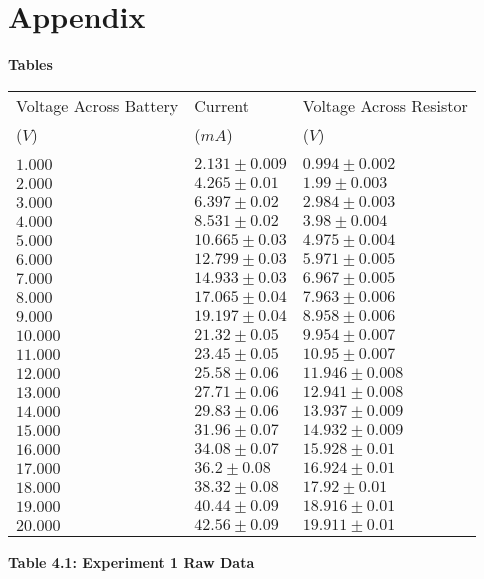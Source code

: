 \documentclass[
	letterpaper, %
	10pt, %
]{CSUniSchoolLabReport}
\begin{document}
\section{Appendix}
{\large \textbf{Tables}}\\
\begin{center}
	\begin{tabular}{ | l | l | l | }
		\hline
		Voltage Across Battery&Current& Voltage Across Resistor\\
		($V$) & ($mA$) & ($V$)\\
		 & & \\
		\hline
		$1.000$&$2.131\pm0.009$&$0.994\pm0.002$\\
		$2.000$&$4.265\pm0.01$&$1.99\pm0.003$\\
		$3.000$&$6.397\pm0.02$&$2.984\pm0.003$\\
		$4.000$&$8.531\pm0.02$&$3.98\pm0.004$\\
		$5.000$&$10.665\pm0.03$&$4.975\pm0.004$\\
		$6.000$&$12.799\pm0.03$&$5.971\pm0.005$\\
		$7.000$&$14.933\pm0.03$&$6.967\pm0.005$\\
		$8.000$&$17.065\pm0.04$&$7.963\pm0.006$\\
		$9.000$&$19.197\pm0.04$&$8.958\pm0.006$\\
		$10.000$&$21.32\pm0.05$&$9.954\pm0.007$\\
		$11.000$&$23.45\pm0.05$&$10.95\pm0.007$\\
		$12.000$&$25.58\pm0.06$&$11.946\pm0.008$\\
		$13.000$&$27.71\pm0.06$&$12.941\pm0.008$\\
		$14.000$&$29.83\pm0.06$&$13.937\pm0.009$\\
		$15.000$&$31.96\pm0.07$&$14.932\pm0.009$\\
		$16.000$&$34.08\pm0.07$&$15.928\pm0.01$\\
		$17.000$&$36.2\pm0.08$&$16.924\pm0.01$\\
		$18.000$&$38.32\pm0.08$&$17.92\pm0.01$\\
		$19.000$&$40.44\pm0.09$&$18.916\pm0.01$\\
		$20.000$&$42.56\pm0.09$&$19.911\pm0.01$\\
		\hline
	\end{tabular}
\end{center}
\begin{center}
    \textbf{Table 4.1: Experiment 1 Raw Data}\\
\end{center}
\end{document}
